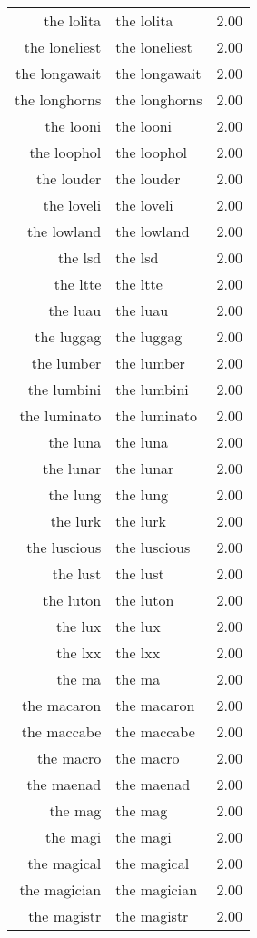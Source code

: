 \begin{table}[ht]
\begin{tabular}{rlr}
  the lolita & the lolita & 2.00 \\ 
  the loneliest & the loneliest & 2.00 \\ 
  the longawait & the longawait & 2.00 \\ 
  the longhorns & the longhorns & 2.00 \\ 
  the looni & the looni & 2.00 \\ 
  the loophol & the loophol & 2.00 \\ 
  the louder & the louder & 2.00 \\ 
  the loveli & the loveli & 2.00 \\ 
  the lowland & the lowland & 2.00 \\ 
  the lsd & the lsd & 2.00 \\ 
  the ltte & the ltte & 2.00 \\ 
  the luau & the luau & 2.00 \\ 
  the luggag & the luggag & 2.00 \\ 
  the lumber & the lumber & 2.00 \\ 
  the lumbini & the lumbini & 2.00 \\ 
  the luminato & the luminato & 2.00 \\ 
  the luna & the luna & 2.00 \\ 
  the lunar & the lunar & 2.00 \\ 
  the lung & the lung & 2.00 \\ 
  the lurk & the lurk & 2.00 \\ 
  the luscious & the luscious & 2.00 \\ 
  the lust & the lust & 2.00 \\ 
  the luton & the luton & 2.00 \\ 
  the lux & the lux & 2.00 \\ 
  the lxx & the lxx & 2.00 \\ 
  the ma & the ma & 2.00 \\ 
  the macaron & the macaron & 2.00 \\ 
  the maccabe & the maccabe & 2.00 \\ 
  the macro & the macro & 2.00 \\ 
  the maenad & the maenad & 2.00 \\ 
  the mag & the mag & 2.00 \\ 
  the magi & the magi & 2.00 \\ 
  the magical & the magical & 2.00 \\ 
  the magician & the magician & 2.00 \\ 
  the magistr & the magistr & 2.00 \\ 

\end{tabular}
\end{table}
